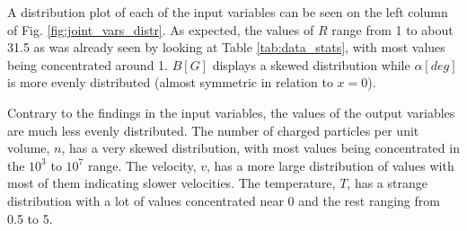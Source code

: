 A distribution plot of each of the input variables can be seen on the left column of Fig. \ref{fig:joint_vars_distr}. As expected, the values of $R$ range from 1 to about 31.5 as was already seen by looking at Table \ref{tab:data_stats}, with most values being concentrated around 1. $B [G]$ displays a skewed distribution while $\alpha [deg]$ is more evenly distributed (almost symmetric in relation to $x=0$).

Contrary to the findings in the input variables, the values of the output variables are much less evenly distributed. The number of charged particles per unit volume, $n$, has a very skewed distribution, with most values being concentrated in the $10^{3}$ to $10^{7}$ range. The velocity, $v$, has a more large distribution of values with most of them indicating slower velocities. The temperature, $T$, has a strange distribution with a lot of values concentrated near 0 and the rest ranging from 0.5 to 5.

